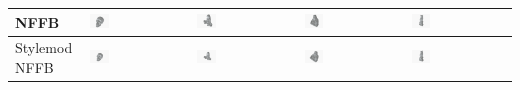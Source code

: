 \begin{table}[H]
\begin{tabularx}{\textwidth}{|p{3.2cm}|X|X|X|X|}
\hline
NFFB & \includegraphics[width=0.2\textwidth]{images/chapter5_img/MeshReconResults/NFFB/65.jpg} & \includegraphics[width=0.2\textwidth]{images/chapter5_img/MeshReconResults/NFFB/110.jpg} & \includegraphics[width=0.2\textwidth]{images/chapter5_img/MeshReconResults/NFFB/114.jpg} & \includegraphics[width=0.2\textwidth]{images/chapter5_img/MeshReconResults/NFFB/122.jpg} \\
\hline
Stylemod NFFB & \includegraphics[width=0.2\textwidth]{images/chapter5_img/MeshReconResults/StylemodNFFB/65.jpg} & \includegraphics[width=0.2\textwidth]{images/chapter5_img/MeshReconResults/StylemodNFFB/110.jpg} & \includegraphics[width=0.2\textwidth]{images/chapter5_img/MeshReconResults/StylemodNFFB/114.jpg} & \includegraphics[width=0.2\textwidth]{images/chapter5_img/MeshReconResults/StylemodNFFB/122.jpg} \\

\end{tabularx}
\end{table}
